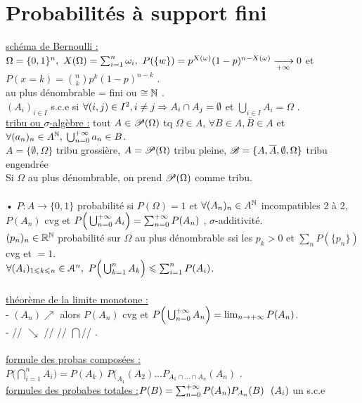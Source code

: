 \documentclass[12 pt]{exampleclass}
\begin{document}
\section{Probabilités à support fini}

\underline{schéma de Bernoulli :} $\Omega = \{0,1\}^n, \ X(\Omega) = \sum_{i=1}^n \omega_i , \ P(\{w\}) = p^{X(\omega)}(1-p)^{n-X(\omega)} \xrightarrow[+\infty]{} 0$ et $P(x =k) = \binom{n}{k} p^k (1-p)^{n-k}$ .\\
au plus dénombrable = fini ou $\cong \mathbb{N}$ .\\
$(A_i)_{i\in I}$ s.c.e si $\forall (i,j)\in I^2, i\neq j \Rightarrow A_i\cap A_j = \emptyset$ et $\bigcup_{i\in I} A_i = \Omega$ .\\
\underline{tribu ou $\sigma$-algèbre :} tout $A\in \mathscr{P}(\Omega)$ tq $\Omega\in A$, $\forall B\in A, \overline{B}\in A$ et $\forall(a_n)_n\in A^{\mathbb{N}}, \; \bigcup_{n=0}^{+\infty} a_n \in B$.\\
$A = \{\emptyset, \Omega\}$ tribu grossière, $A= \mathscr{P}(\Omega)$ tribu pleine, $ \mathscr{B} = \{A, \overline{A}, \emptyset, \Omega\}$ tribu engendrée\\
Si $\Omega$ au plus dénombrable, on prend $\mathscr{P}(\Omega)$ comme tribu.\\
\text{}\\
• $P : A \to \{0,1\}$ probabilité si $P(\Omega) = 1$ et $\forall (A_n)_n\in A^{\mathbb{N}}$ incompatibles 2 à 2, $P(A_n)$ cvg et $P\Big(\bigcup_{n=0}^{+\infty} A_i \Big) = \sum_{n=0}^{+\infty} P(A_n)$ , $\sigma$-additivité.\\
$(p_n)_n\in\mathbb{R}^{\mathbb{N}}$ probabilité sur $\Omega$ au plus dénombrable ssi les $p_k>0$ et $\sum_n P(\{p_n\})$ cvg et $=1$.\\
$\forall (A_i)_{1\leqslant k \leqslant n} \in \mathcal{A}^n, \ P\Big(\bigcup_{k=1}^n A_k \Big) \leqslant \sum_{i=1}^n P(A_i)$.\\
\newpage
\text{}\\
\underline{théorème de la limite monotone :}\\
- $(A_n) \nearrow$ alors $P(A_n)$ cvg et $P\Big(\bigcup_{n=0}^{+\infty} A_n \Big) = \lim_{n\to +\infty} P(A_n)$.\\
 - // \qquad $\searrow$ \qquad // \qquad // \qquad$\bigcap$\qquad // .\\
\text{}\\
\underline{formule des probas composées :} $P\Big(\bigcap_{i=1}^n A_i\Big) = P(A_k) \, P(_{A_1}(A_2) \dots P_{A_1 \cap \dots \cap A_n}(A_n)$ .\\
\underline{formules des probabes totales :}$P(B) = \sum_{n=0}^{+\infty} P(A_n)P_{A_n}(B) \  \ (A_i)$ un s.c.e\\
\end{document}
